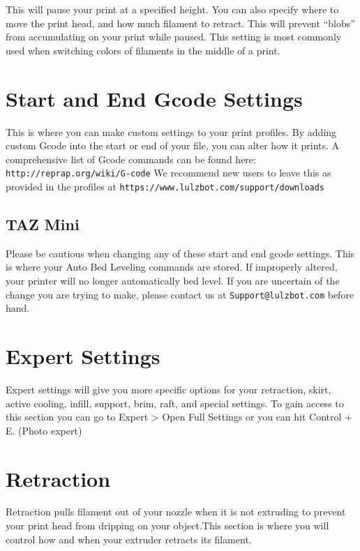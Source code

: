 This will pause your print at a specified height. You can also specify where 	to move the print head, and how much filament to retract. This will prevent “blobs” from accumulating on your print while paused. This setting is most commonly used when switching colors of filaments in the middle of a print.

\section{Start and End Gcode Settings}

This is where you can make custom settings to your print profiles. By adding custom Gcode into the start or end of your file, you can alter how it prints. A comprehensive list of Gcode commands can be found here: \texttt{http://reprap.org/wiki/G-code} We recommend new users to leave this as provided in the profiles at \texttt{https://www.lulzbot.com/support/downloads}

\subsection{TAZ Mini}
Please be cautious when changing any of these start and end gcode settings. This is where your Auto Bed Leveling commands are stored. If improperly altered, your printer will no longer 	automatically bed level. If you are uncertain of the change you are trying to make, please contact us at \texttt{Support@lulzbot.com} before hand.

\section{Expert Settings}

Expert settings will give you more specific options for your retraction, skirt, active cooling, infill, support, brim, raft, and special settings. To gain access to this section you can go to Expert > Open Full Settings or you can hit Control + E. (Photo expert)

\section{Retraction}

Retraction pulls filament out of your nozzle when it is not extruding to prevent your print head from dripping on your object.This section is where you will control how and when your extruder retracts its filament.

